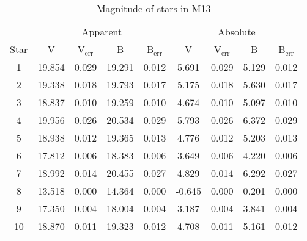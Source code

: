 \documentclass[10pt]{article}
\begin{document}
\begin{longtable}[c]{ccccc|cccc}
\caption{Magnitude of stars in M13 \label{tab:table}} \\

	& \multicolumn{4}{c}{Apparent} &  \multicolumn{4}{c}{Absolute} \\
	\cmidrule(lr){2-9}
	Star & V & V$_{ \text{err}}$ & B & B$_{ \text{err}}$ & V & V$_{ \text{err}}$ & B & B$_{ \text{err}}$ \\
	\midrule
	\endhead
		 
	\bottomrule
	\endfoot
		 
1 & \cellcolor{ gray!10 }  19.854 &  0.029 & \cellcolor{ gray!10 }  19.291 &  0.012 & \cellcolor{ gray!10 }  5.691 &  0.029 & \cellcolor{ gray!10 }  5.129 &  0.012 \\
2 & \cellcolor{ gray!10 }  19.338 &  0.018 & \cellcolor{ gray!10 }  19.793 &  0.017 & \cellcolor{ gray!10 }  5.175 &  0.018 & \cellcolor{ gray!10 }  5.630 &  0.017 \\
3 & \cellcolor{ gray!10 }  18.837 &  0.010 & \cellcolor{ gray!10 }  19.259 &  0.010 & \cellcolor{ gray!10 }  4.674 &  0.010 & \cellcolor{ gray!10 }  5.097 &  0.010 \\
4 & \cellcolor{ gray!10 }  19.956 &  0.026 & \cellcolor{ gray!10 }  20.534 &  0.029 & \cellcolor{ gray!10 }  5.793 &  0.026 & \cellcolor{ gray!10 }  6.372 &  0.029 \\
5 & \cellcolor{ gray!10 }  18.938 &  0.012 & \cellcolor{ gray!10 }  19.365 &  0.013 & \cellcolor{ gray!10 }  4.776 &  0.012 & \cellcolor{ gray!10 }  5.203 &  0.013 \\
6 & \cellcolor{ gray!10 }  17.812 &  0.006 & \cellcolor{ gray!10 }  18.383 &  0.006 & \cellcolor{ gray!10 }  3.649 &  0.006 & \cellcolor{ gray!10 }  4.220 &  0.006 \\
7 & \cellcolor{ gray!10 }  18.992 &  0.014 & \cellcolor{ gray!10 }  20.455 &  0.027 & \cellcolor{ gray!10 }  4.829 &  0.014 & \cellcolor{ gray!10 }  6.292 &  0.027 \\
8 & \cellcolor{ gray!10 }  13.518 &  0.000 & \cellcolor{ gray!10 }  14.364 &  0.000 & \cellcolor{ gray!10 } -0.645 &  0.000 & \cellcolor{ gray!10 }  0.201 &  0.000 \\
9 & \cellcolor{ gray!10 }  17.350 &  0.004 & \cellcolor{ gray!10 }  18.004 &  0.004 & \cellcolor{ gray!10 }  3.187 &  0.004 & \cellcolor{ gray!10 }  3.841 &  0.004 \\
10 & \cellcolor{ gray!10 }  18.870 &  0.011 & \cellcolor{ gray!10 }  19.323 &  0.012 & \cellcolor{ gray!10 }  4.708 &  0.011 & \cellcolor{ gray!10 }  5.161 &  0.012 \\

\end{longtable}
\end{document}
